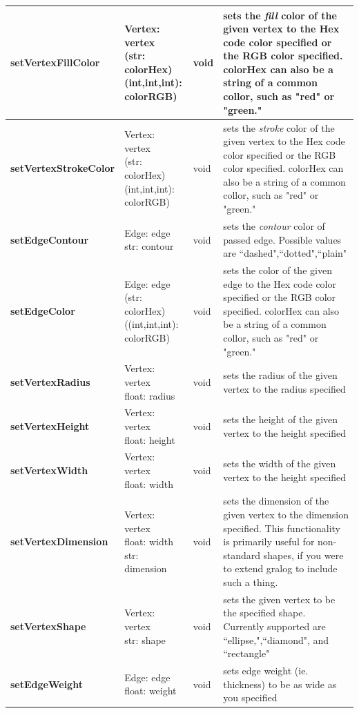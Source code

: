 \documentclass{article}
\newlength\q
\newlength\smallCol
\newlength\argsLen
\begin{document}
\begin{longtable}{m{\smallCol}m{\argsLen}m{\smallCol}m{\q}}
\textbf{setVertexFillColor} & \makecell{Vertex: vertex\\(str: colorHex)\\(int,int,int): colorRGB)} & void & sets the \textit{fill} color of the given vertex to the Hex code color specified or the RGB color specified. colorHex can also be a string of a common collor, such as "red" or "green."  \\ \hline
\textbf{setVertexStrokeColor} & \makecell{Vertex: vertex\\(str: colorHex)\\(int,int,int): colorRGB)} & void & sets the \textit{stroke} color of the given vertex to the Hex code color specified or the RGB color specified. colorHex can also be a string of a common collor, such as "red" or "green."  \\ \hline
\textbf{setEdgeContour} & \makecell{Edge: edge\\str: contour} & void & sets the \textit{contour} color of passed edge. Possible values are ``dashed",``dotted",``plain" \\ \hline
\textbf{setEdgeColor} & \makecell{Edge: edge\\(str: colorHex)\\((int,int,int): colorRGB)} & void & sets the color of the given edge to the Hex code color specified or the RGB color specified. colorHex can also be a string of a common collor, such as "red" or "green."  \\ \hline
\textbf{setVertexRadius} & \makecell{Vertex: vertex\\float: radius} & void & sets the radius of the given vertex to the radius specified  \\ \hline
\textbf{setVertexHeight} & \makecell{Vertex: vertex\\float: height} & void & sets the height of the given vertex to the height specified  \\ \hline
\textbf{setVertexWidth} & \makecell{Vertex: vertex\\float: width} & void & sets the width of the given vertex to the height specified  \\ \hline
\textbf{setVertexDimension} & \makecell{Vertex: vertex\\float: width\\str: dimension} & void & sets the dimension of the given vertex to the dimension specified. This functionality is primarily useful for non-standard shapes, if you were to extend gralog to include such a thing. \\ \hline
\textbf{setVertexShape} & \makecell{Vertex: vertex\\str: shape} & void & sets the given vertex to be the specified shape. Currently supported are ``ellipse,",``diamond", and ``rectangle"  \\ \hline
\textbf{setEdgeWeight} & \makecell{Edge: edge\\float: weight} & void & sets edge weight (ie. thickness) to be as wide as you specified  \\ \hline
\end{longtable}
\end{document}
